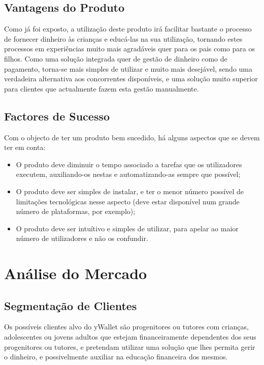 \documentclass[12pt,a4paper]{article}
\begin{document}
\subsection{Vantagens do Produto}
\label{subsec:vantagens_do_produto}

Como já foi exposto, a utilização deste produto irá facilitar bastante o processo de fornecer dinheiro às crianças e educá-las na sua utilização, tornando estes processos em experiências muito mais agradáveis quer para os pais como para os filhos. Como uma solução integrada quer de gestão de dinheiro como de pagamento, torna-se mais simples de utilizar e muito mais desejável, sendo uma verdadeira alternativa aos concorrentes disponíveis, e uma solução muito superior para clientes que actualmente fazem esta gestão manualmente.

\subsection{Factores de Sucesso}
\label{subsec:factores_de_sucesso}

Com o objecto de ter um produto bem sucedido, há alguns aspectos que se devem ter em conta:

\begin{itemize}
\item O produto deve diminuir o tempo associado a tarefas que os utilizadores executem, auxiliando-os nestas e automatizando-as sempre que possível;
\item O produto deve ser simples de instalar, e ter o menor número possível de limitações tecnológicas nesse aspecto (deve estar disponível num grande número de plataformas, por exemplo);
\item O produto deve ser intuítivo e simples de utilizar, para apelar ao maior número de utilizadores e não os confundir.
\end{itemize}

\newpage
\section{Análise do Mercado}
\label{sec:analise_do_mercado}


\subsection{Segmentação de Clientes}
\label{subsec:segmentacao_de_clientes}

Os possíveis clientes alvo do yWallet são progenitores ou tutores com crianças, adolescentes ou jovens adultos que estejam financeiramente dependentes dos seus progenitores ou tutores, e pretendam utilizar uma solução que lhes permita gerir o dinheiro, e possivelmente auxiliar na educação financeira dos mesmos.
\end{document}

